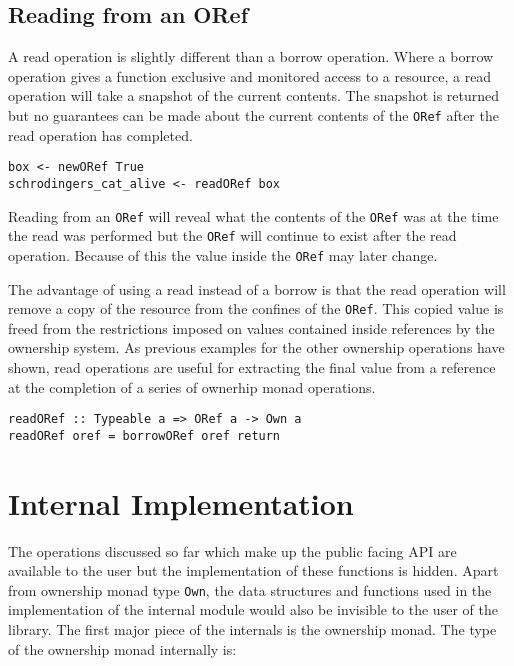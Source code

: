 \documentclass[onehalf,11pt]{beavtex}
\begin{document}
\subsection{Reading from an ORef}

A read operation is slightly different than a borrow operation. Where a borrow
operation gives a function exclusive and monitored access to a resource, a read
operation will take a snapshot of the current contents. The snapshot is returned
but no guarantees can be made about the current contents of the \texttt{ORef}
after the read operation has completed.

\begin{lstlisting}
box <- newORef True
schrodingers_cat_alive <- readORef box
\end{lstlisting}

Reading from an \texttt{ORef} will reveal what the contents of the \texttt{ORef}
was at the time the read was performed but the \texttt{ORef} will continue to
exist after the read operation. Because of this the value inside
the \texttt{ORef} may later change.

The advantage of using a read instead of a borrow is that the read operation will
remove a copy of the resource from the confines of the \texttt{ORef}.
This copied value is freed from the restrictions imposed on values
contained inside references by the ownership system.
As previous examples for the other ownership operations have shown, read
operations are useful for extracting the final value from a reference at the
completion of a series of ownerhip monad operations.

\begin{verbatim}
readORef :: Typeable a => ORef a -> Own a
readORef oref = borrowORef oref return
\end{verbatim}

\section{Internal Implementation}

The operations discussed so far which make up the public facing API are
available to the user but the implementation of these functions is hidden.
Apart from ownership monad type \texttt{Own},
the data structures and functions used in the implementation of the internal
module would also be invisible to the user of the library. The first major
piece of the internals is the ownership monad. The type of the ownership monad
internally is:
\end{document}
